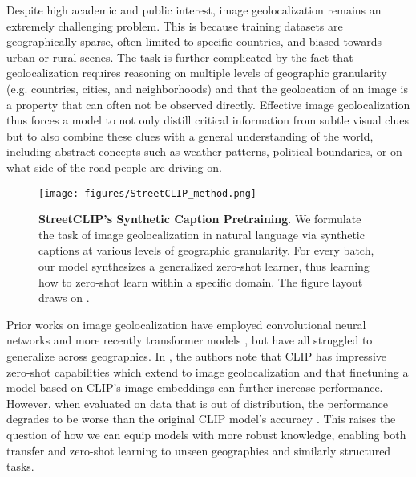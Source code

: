 \documentclass{article}
\renewcommand{\cite}[1]{\citep{#1}}
\begin{document}
Despite high academic and public interest, image geolocalization remains an extremely challenging problem. This is because training datasets are geographically sparse, often limited to specific countries, and biased towards urban or rural scenes. The task is further complicated by the fact that geolocalization requires reasoning on multiple levels of geographic granularity (e.g. countries, cities, and neighborhoods) and that the geolocation of an image is a property that can often not be observed directly. Effective image geolocalization thus forces a model to not only distill critical information from subtle visual clues but to also combine these clues with a general understanding of the world, including abstract concepts such as weather patterns, political boundaries, or on what side of the road people are driving on.

\begin{figure*}[htb]
\vskip 0.1in
\begin{center}
\centerline{\texttt{[image: figures/StreetCLIP\_method.png]}}
\caption{\textbf{StreetCLIP's Synthetic Caption Pretraining}. We formulate the task of image geolocalization in natural language via synthetic captions at
various levels of geographic granularity. For every batch, our model synthesizes a generalized zero-shot learner, thus learning how to zero-shot learn within a specific domain. The figure layout draws on \citet{radford21a}.}
\label{streetclip}
\end{center}
\vskip -0.1in
\end{figure*}

Prior works on image geolocalization have employed convolutional neural networks \cite{Weyand_2016, vo_et_al} and more recently transformer models \cite{pramanick_2022, wu_huang_2022, luo_2022}, but have all struggled to generalize across geographies. In \citet{wu_huang_2022}, the authors note that CLIP \cite{radford21a} has impressive zero-shot capabilities which extend to image geolocalization and that finetuning a model based on CLIP's image embeddings can further increase performance. However, when evaluated on data that is out of distribution, the performance degrades to be worse than the original CLIP model's accuracy \cite{wu_huang_2022}. This raises the question of how we can equip models with more robust knowledge, enabling both transfer and zero-shot learning to unseen geographies and similarly structured tasks.
\end{document}
